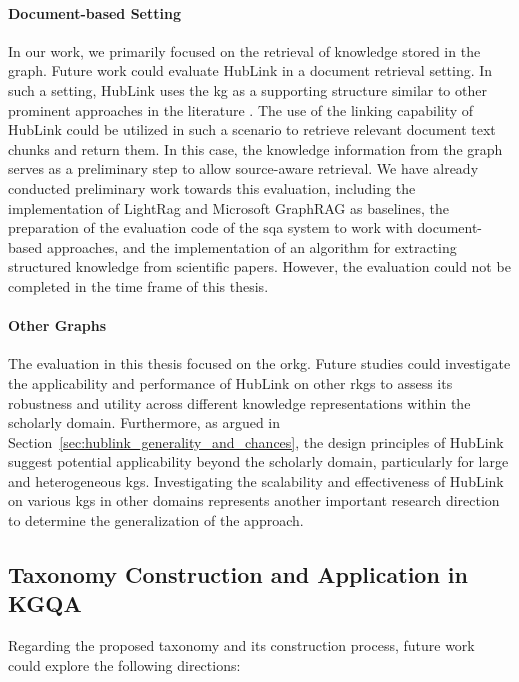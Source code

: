 \paragraph{Document-based Setting} In our work, we primarily focused on the retrieval of knowledge stored in the graph. Future work could evaluate HubLink in a document retrieval setting. In such a setting, HubLink uses the \gls{kg} as a supporting structure similar to other prominent approaches in the literature \cite{edge_local_2024,guo_lightrag_2024}. The use of the linking capability of HubLink could be utilized in such a scenario to retrieve relevant document text chunks and return them. In this case, the knowledge information from the graph serves as a preliminary step to allow source-aware retrieval. We have already conducted preliminary work towards this evaluation, including the implementation of LightRag \cite{guo_lightrag_2024} and Microsoft GraphRAG \cite{edge_local_2024} as baselines, the preparation of the evaluation code of the \gls{sqa} system to work with document-based approaches, and the implementation of an algorithm for extracting structured knowledge from scientific papers. However, the evaluation could not be completed in the time frame of this thesis.

\paragraph{Other Graphs} The evaluation in this thesis focused on the \gls{orkg}. Future studies could investigate the applicability and performance of HubLink on other \glspl{rkg} to assess its robustness and utility across different knowledge representations within the scholarly domain. Furthermore, as argued in Section~\ref{sec:hublink_generality_and_chances}, the design principles of HubLink suggest potential applicability beyond the scholarly domain, particularly for large and heterogeneous \glspl{kg}. Investigating the scalability and effectiveness of HubLink on various \glspl{kg} in other domains represents another important research direction to determine the generalization of the approach.


\subsection{Taxonomy Construction and Application in KGQA}

Regarding the proposed taxonomy and its construction process, future work could explore the following directions:

